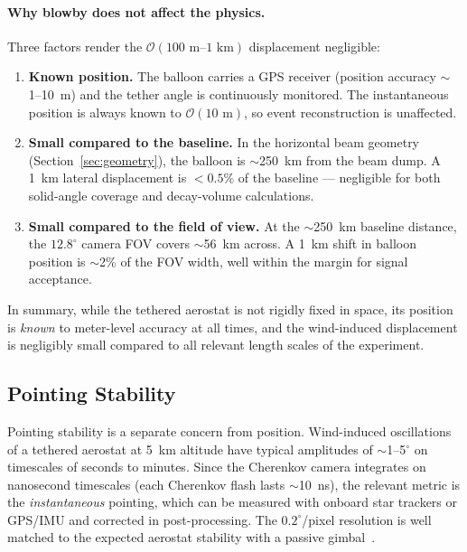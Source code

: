 \documentclass[11pt]{article}
\begin{document}
\paragraph{Why blowby does not affect the physics.}
Three factors render the $\mathcal{O}(100\text{~m--}1\text{~km})$
displacement negligible:
\begin{enumerate}[nosep]
  \item \textbf{Known position.}  The balloon carries a GPS receiver
        (position accuracy $\sim$1--10~m) and the tether angle is
        continuously monitored.  The instantaneous position is always
        known to $\mathcal{O}(10\text{~m})$, so event reconstruction
        is unaffected.
  \item \textbf{Small compared to the baseline.}  In the horizontal beam
        geometry (Section~\ref{sec:geometry}), the balloon is
        $\sim$250~km from the beam dump.  A 1~km lateral displacement
        is $< 0.5\%$ of the baseline --- negligible for both solid-angle
        coverage and decay-volume calculations.
  \item \textbf{Small compared to the field of view.}  At the
        $\sim$250~km baseline distance, the $12.8^\circ$ camera FOV
        covers $\sim$56~km across.  A 1~km shift in balloon position
        is $\sim$2\% of the FOV width, well within the margin for
        signal acceptance.
\end{enumerate}

In summary, while the tethered aerostat is not rigidly fixed in space,
its position is \emph{known} to meter-level accuracy at all times,
and the wind-induced displacement is negligibly small compared to all
relevant length scales of the experiment.

\subsection{Pointing Stability}

Pointing stability is a separate concern from position.
Wind-induced oscillations of a tethered aerostat at 5~km altitude
have typical amplitudes of $\sim$1--5$^\circ$ on timescales of seconds
to minutes.  Since the Cherenkov camera integrates on nanosecond
timescales (each Cherenkov flash lasts $\sim$10~ns), the relevant
metric is the \emph{instantaneous} pointing, which can be measured
with onboard star trackers or GPS/IMU and corrected in
post-processing.  The $0.2^\circ$/pixel resolution is well matched
to the expected aerostat stability with a passive
gimbal~\cite{Davidson2012,ScrandisDeaconu}.
\end{document}
